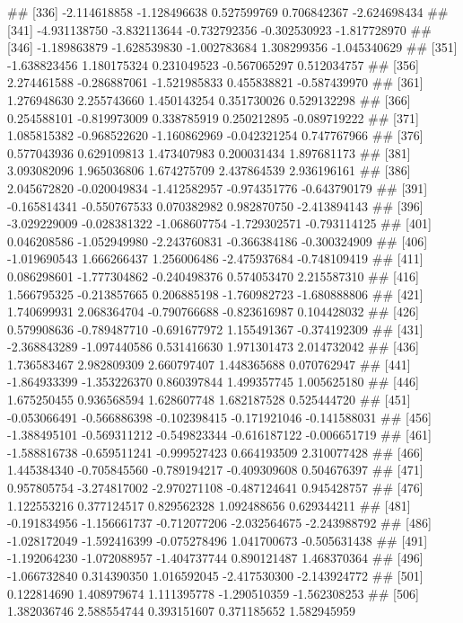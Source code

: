 \documentclass[
]{article}
\begin{document}
\begin{enumerate}[label=(\alph*)]
##  [336] -2.114618858 -1.128496638  0.527599769  0.706842367 -2.624698434
##  [341] -4.931138750 -3.832113644 -0.732792356 -0.302530923 -1.817728970
##  [346] -1.189863879 -1.628539830 -1.002783684  1.308299356 -1.045340629
##  [351] -1.638823456  1.180175324  0.231049523 -0.567065297  0.512034757
##  [356]  2.274461588 -0.286887061 -1.521985833  0.455838821 -0.587439970
##  [361]  1.276948630  2.255743660  1.450143254  0.351730026  0.529132298
##  [366]  0.254588101 -0.819973009  0.338785919  0.250212895 -0.089719222
##  [371]  1.085815382 -0.968522620 -1.160862969 -0.042321254  0.747767966
##  [376]  0.577043936  0.629109813  1.473407983  0.200031434  1.897681173
##  [381]  3.093082096  1.965036806  1.674275709  2.437864539  2.936196161
##  [386]  2.045672820 -0.020049834 -1.412582957 -0.974351776 -0.643790179
##  [391] -0.165814341 -0.550767533  0.070382982  0.982870750 -2.413894143
##  [396] -3.029229009 -0.028381322 -1.068607754 -1.729302571 -0.793114125
##  [401]  0.046208586 -1.052949980 -2.243760831 -0.366384186 -0.300324909
##  [406] -1.019690543  1.666266437  1.256006486 -2.475937684 -0.748109419
##  [411]  0.086298601 -1.777304862 -0.240498376  0.574053470  2.215587310
##  [416]  1.566795325 -0.213857665  0.206885198 -1.760982723 -1.680888806
##  [421]  1.740699931  2.068364704 -0.790766688 -0.823616987  0.104428032
##  [426]  0.579908636 -0.789487710 -0.691677972  1.155491367 -0.374192309
##  [431] -2.368843289 -1.097440586  0.531416630  1.971301473  2.014732042
##  [436]  1.736583467  2.982809309  2.660797407  1.448365688  0.070762947
##  [441] -1.864933399 -1.353226370  0.860397844  1.499357745  1.005625180
##  [446]  1.675250455  0.936568594  1.628607748  1.682187528  0.525444720
##  [451] -0.053066491 -0.566886398 -0.102398415 -0.171921046 -0.141588031
##  [456] -1.388495101 -0.569311212 -0.549823344 -0.616187122 -0.006651719
##  [461] -1.588816738 -0.659511241 -0.999527423  0.664193509  2.310077428
##  [466]  1.445384340 -0.705845560 -0.789194217 -0.409309608  0.504676397
##  [471]  0.957805754 -3.274817002 -2.970271108 -0.487124641  0.945428757
##  [476]  1.122553216  0.377124517  0.829562328  1.092488656  0.629344211
##  [481] -0.191834956 -1.156661737 -0.712077206 -2.032564675 -2.243988792
##  [486] -1.028172049 -1.592416399 -0.075278496  1.041700673 -0.505631438
##  [491] -1.192064230 -1.072088957 -1.404737744  0.890121487  1.468370364
##  [496] -1.066732840  0.314390350  1.016592045 -2.417530300 -2.143924772
##  [501]  0.122814690  1.408979674  1.111395778 -1.290510359 -1.562308253
##  [506]  1.382036746  2.588554744  0.393151607  0.371185652  1.582945959

\end{enumerate}
\end{document}
